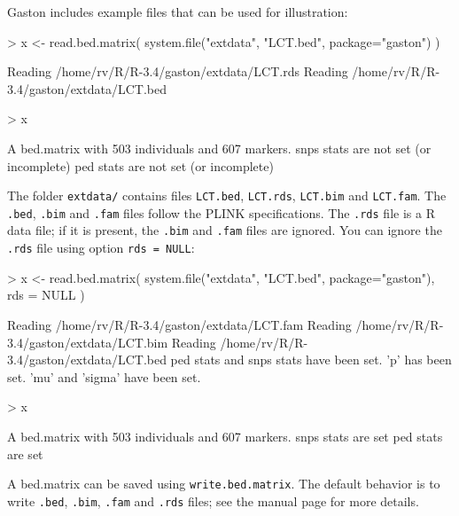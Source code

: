 \documentclass{article}
\renewenvironment{Schunk}{\vspace{\topsep}}{\vspace{\topsep}}
\begin{document}
  Gaston includes example files that can be used for illustration:

\begin{Schunk}
\begin{Sinput}
> x <- read.bed.matrix( system.file("extdata", "LCT.bed", package="gaston") )
\end{Sinput}
\begin{Soutput}
Reading /home/rv/R/R-3.4/gaston/extdata/LCT.rds 
Reading /home/rv/R/R-3.4/gaston/extdata/LCT.bed 
\end{Soutput}
\begin{Sinput}
> x
\end{Sinput}
\begin{Soutput}
A bed.matrix with 503 individuals and 607 markers.
snps stats are not set (or incomplete)
ped stats are not set (or incomplete)
\end{Soutput}
\end{Schunk}
  
  The folder \verb!extdata/! contains files \verb!LCT.bed!, \verb!LCT.rds!,
  \verb!LCT.bim! and \verb!LCT.fam!. The \verb!.bed!, \verb!.bim! and \verb!.fam! files follow the
  PLINK specifications. The \verb!.rds! file is a R data file; if it is present, the
  \verb!.bim! and \verb!.fam! files are ignored. You can ignore the
  \verb!.rds! file using option \verb!rds = NULL!:

\begin{Schunk}
\begin{Sinput}
> x <- read.bed.matrix( system.file("extdata", "LCT.bed", package="gaston"), rds = NULL )
\end{Sinput}
\begin{Soutput}
Reading /home/rv/R/R-3.4/gaston/extdata/LCT.fam 
Reading /home/rv/R/R-3.4/gaston/extdata/LCT.bim 
Reading /home/rv/R/R-3.4/gaston/extdata/LCT.bed 
ped stats and snps stats have been set. 
'p' has been set. 
'mu' and 'sigma' have been set.
\end{Soutput}
\begin{Sinput}
> x
\end{Sinput}
\begin{Soutput}
A bed.matrix with 503 individuals and 607 markers.
snps stats are set
ped stats are set
\end{Soutput}
\end{Schunk}

  A bed.matrix can be saved using \verb!write.bed.matrix!.  
  The default behavior is to write \verb!.bed!, \verb!.bim!, \verb!.fam! 
  and \verb!.rds! files; see the manual page for more details.
\end{document}

